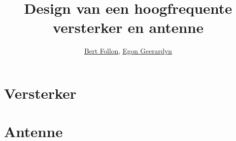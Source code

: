 \documentclass[pdftex,a4paper]{article}
\title{Design van een hoogfrequente versterker en antenne}
\author{\href{mailto:Bert.Follon@vub.ac.be}{Bert Follon},
         \href{mailto:Egon.Geerardyn@vub.ac.be}{Egon Geerardyn}}
\date{\datum}
\begin{document}
  \maketitlepage
  \newpage
  \tableofcontents
  \listoffigures
  \listoftables
  \newpage
  \part{Versterker}
  \label{sec:Amp}
    \cite{BFR91A}
    

  \newpage
  \part{Antenne}
  \label{sec:AE}

    
    
  \newpage
  
  
  
  
\end{document}
